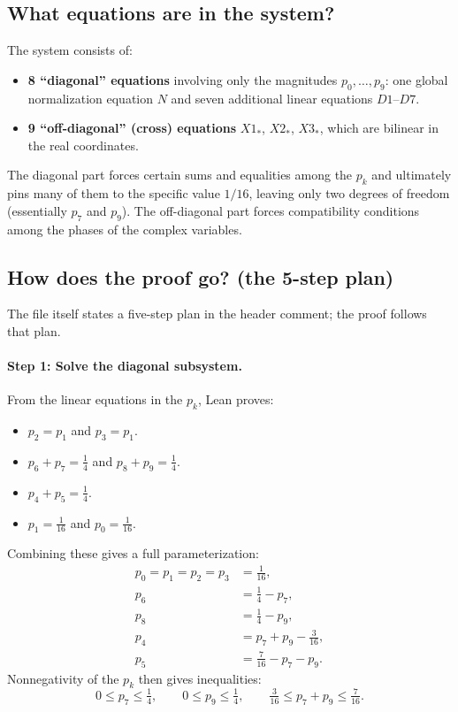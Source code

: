\documentclass[11pt]{article}
\begin{document}
\subsection*{What equations are in the system?}

The system consists of:
\begin{itemize}
\item \textbf{8 ``diagonal'' equations} involving only the magnitudes $p_0,\dots,p_9$:
  one global normalization equation $N$ and seven additional linear equations $D1$--$D7$.
\item \textbf{9 ``off-diagonal'' (cross) equations} $X1_{\ast}$, $X2_{\ast}$, $X3_{\ast}$, which are bilinear in the real coordinates.
\end{itemize}

The diagonal part forces certain sums and equalities among the $p_k$ and ultimately pins many of them to the specific value $1/16$, leaving only two degrees of freedom (essentially $p_7$ and $p_9$).  The off-diagonal part forces compatibility conditions among the phases of the complex variables.

\subsection*{How does the proof go? (the 5-step plan)}

The file itself states a five-step plan in the header comment; the proof follows that plan.

\paragraph{Step 1: Solve the diagonal subsystem.}
From the linear equations in the $p_k$, Lean proves:
\begin{itemize}
\item $p_2=p_1$ and $p_3=p_1$.
\item $p_6+p_7=\frac14$ and $p_8+p_9=\frac14$.
\item $p_4+p_5=\frac14$.
\item $p_1=\frac1{16}$ and $p_0=\frac1{16}$.
\end{itemize}
Combining these gives a full parameterization:
\[
\begin{aligned}
p_0=p_1=p_2=p_3&=\frac1{16},\\
p_6&=\frac14-p_7,\\
p_8&=\frac14-p_9,\\
p_4&=p_7+p_9-\frac3{16},\\
p_5&=\frac7{16}-p_7-p_9.
\end{aligned}
\]
Nonnegativity of the $p_k$ then gives inequalities:
\[
0\le p_7\le \tfrac14,\qquad 0\le p_9\le \tfrac14,\qquad
\tfrac3{16}\le p_7+p_9\le \tfrac7{16}.
\]
\end{document}
